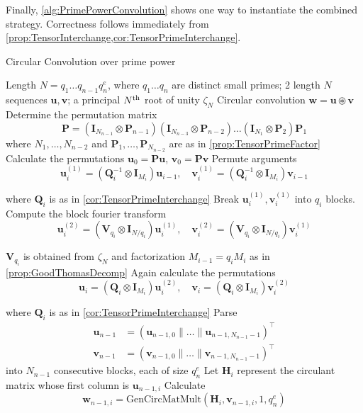 Finally, \cref{alg:PrimePowerConvolution} shows one way to instantiate the combined strategy. Correctness follows immediately from \cref{prop:TensorInterchange,cor:TensorPrimeInterchange}.
\begin{algorithm}[ht]
    \caption{Circular Convolution over prime power} \label{alg:PrimePowerConvolution}
    \begin{algorithmic}[1]
        \Require Length \(N = q_1 \ldots q_{n-1} q_n^e\), where \(q_1\ldots q_n\) are distinct small primes; 2 length \(N\) sequences \(\bm{u}, \bm{v}\); a principal \(N\textsuperscript{th}\) root of unity \(\zeta_N\)
        \Ensure Circular convolution \(\bm{w} = \bm{u} \circledast \bm{v}\)
        \State Determine the permutation matrix
        \[\bm{P} = \left(\bm{I}_{N_{n-1}} \otimes \bm{P}_{n-1}\right) \left(\bm{I}_{N_{n-3}} \otimes \bm{P}_{n-2}\right) \ldots \left(\bm{I}_{N_1} \otimes \bm{P}_2\right) \bm{P}_1\]
        where \(N_1, \ldots , N_{n-2}\) and \(\bm{P}_1, \ldots , \bm{P}_{N_{n-2}}\) are as in \cref{prop:TensorPrimeFactor}
        \State Calculate the permutations \(\bm{u}_0 = \bm{P} \bm{u}\), \(\bm{v}_0 = \bm{P} \bm{v}\)
            \State Permute arguments 
            \[\bm{u}_i^{(1)} = \left(\bm{Q}_i^{-1} \otimes \bm{I}_{M_i}\right) \bm{u}_{i-1}, \quad \bm{v}_i^{(1)} = \left(\bm{Q}_i^{-1} \otimes \bm{I}_{M_i}\right) \bm{v}_{i-1}\]

            where \(\bm{Q}_i\) is as in \cref{cor:TensorPrimeInterchange}
            \State Break \(\bm{u}_i^{(1)}, \bm{v}_i^{(1)}\) into \(q_i\) blocks. Compute the block fourier transform
            \[\bm{u}_i^{(2)} = \left(\bm{V}_{q_i} \otimes \bm{I}_{N / q_i}\right) \bm{u}_i^{(1)}, \quad \bm{v}_i^{(2)} = \left(\bm{V}_{q_i} \otimes \bm{I}_{N / q_i}\right) \bm{v}_i^{(1)}\]

            \(\bm{V}_{q_i}\) is obtained from \(\zeta_N\) and factorization \(M_{i-1} = q_i M_i\) as in \cref{prop:GoodThomasDecomp}
            \State Again calculate the permutations
            \[\bm{u}_i = \left(\bm{Q}_i \otimes \bm{I}_{M_i}\right) \bm{u}_i^{(2)}, \quad \bm{v}_i = \left(\bm{Q}_i \otimes \bm{I}_{M_i}\right) \bm{v}_i^{(2)}\]

            where \(\bm{Q}_i\) is as in \cref{cor:TensorPrimeInterchange}
        \EndFor
        \State Parse
        \begin{align*}
            \bm{u}_{n-1} &= (\bm{u}_{n-1, 0} \parallel \ldots \parallel \bm{u}_{n-1, N_{n-1}-1})^{\top} \\
            \bm{v}_{n-1} &= (\bm{v}_{n-1, 0} \parallel \ldots \parallel \bm{v}_{n-1, N_{n-1}-1})^{\top}
        \end{align*}
        into \(N_{n-1}\) consecutive blocks, each of size \(q_n^e\)
            \State Let \(\bm{H}_i\) represent the circulant matrix whose first column is \(\bm{u}_{n-1, i}\)
            \State Calculate
            \[\bm{w}_{n-1, i} = \text{GenCircMatMult}(\bm{H}_i, \bm{v}_{n-1, i}, 1, q_n^e)\]


\end{algorithmic}
\end{algorithm}
